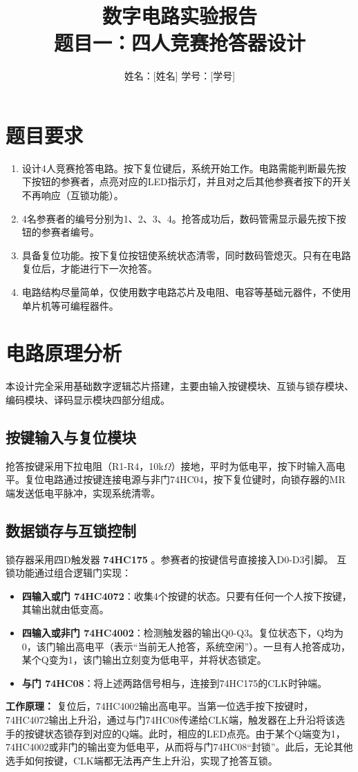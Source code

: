 \documentclass[12pt,a4paper]{article}
\title{\vspace{-2cm}\heiti\zihao{2} 数字电路实验报告 \\ \vspace{0.5cm} \kaishu\zihao{3} 题目一：四人竞赛抢答器设计}
\author{姓名：[姓名] \quad 学号：[学号]}
\begin{document}
\maketitle
\thispagestyle{empty}

\section{题目要求}
\begin{enumerate}
    \item 设计4人竞赛抢答电路。按下复位键后，系统开始工作。电路需能判断最先按下按钮的参赛者，点亮对应的LED指示灯，并且对之后其他参赛者按下的开关不再响应（互锁功能）。
    \item 4名参赛者的编号分别为1、2、3、4。抢答成功后，数码管需显示最先按下按钮的参赛者编号。
    \item 具备复位功能。按下复位按钮使系统状态清零，同时数码管熄灭。只有在电路复位后，才能进行下一次抢答。
    \item 电路结构尽量简单，仅使用数字电路芯片及电阻、电容等基础元器件，不使用单片机等可编程器件。
\end{enumerate}

\section{电路原理分析}
本设计完全采用基础数字逻辑芯片搭建，主要由输入按键模块、互锁与锁存模块、编码模块、译码显示模块四部分组成。

\subsection{按键输入与复位模块}
抢答按键采用下拉电阻（R1-R4，10k$\Omega$）接地，平时为低电平，按下时输入高电平。复位电路通过按键连接电源与非门74HC04，按下复位键时，向锁存器的MR端发送低电平脉冲，实现系统清零。

\subsection{数据锁存与互锁控制}
锁存器采用四D触发器 \textbf{74HC175} 。参赛者的按键信号直接接入D0-D3引脚。
互锁功能通过组合逻辑门实现：
\begin{itemize}
    \item \textbf{四输入或门 74HC4072}：收集4个按键的状态。只要有任何一个人按下按键，其输出就由低变高。
    \item \textbf{四输入或非门 74HC4002}：检测触发器的输出Q0-Q3。复位状态下，Q均为0，该门输出高电平（表示“当前无人抢答，系统空闲”）。一旦有人抢答成功，某个Q变为1，该门输出立刻变为低电平，并将状态锁定。
    \item \textbf{与门 74HC08}：将上述两路信号相与，连接到74HC175的CLK时钟端。
\end{itemize}
\textbf{工作原理：} 复位后，74HC4002输出高电平。当第一位选手按下按键时，74HC4072输出上升沿，通过与门74HC08传递给CLK端，触发器在上升沿将该选手的按键状态锁存到对应的Q端。此时，相应的LED点亮。由于某个Q端变为1，74HC4002或非门的输出变为低电平，从而将与门74HC08“封锁”。此后，无论其他选手如何按键，CLK端都无法再产生上升沿，实现了抢答互锁。
\end{document}
